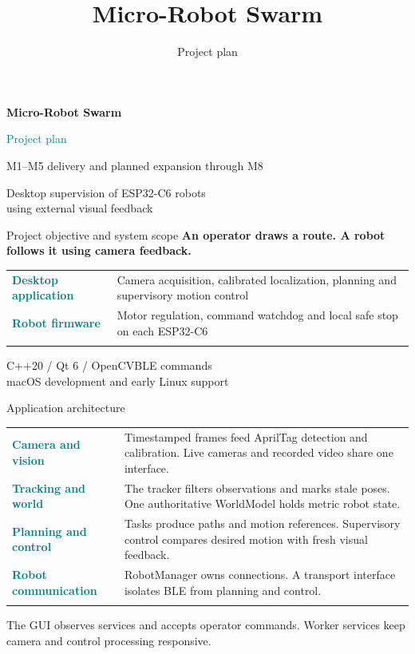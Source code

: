 \documentclass[11pt,aspectratio=169]{beamer}
\title{Micro-Robot Swarm}
\subtitle{Project plan}
\author{}
\date{}
\newcommand{\planrow}[2]{\textcolor{Teal}{\textbf{#1}} & #2 \\\noalign{\vskip 12pt}}
\begin{document}
\begin{frame}[plain]
\vspace{8mm}
{\LARGE\bfseries Micro-Robot Swarm\par}
\vspace{4mm}
{\Large\textcolor{Teal}{Project plan}\par}
\vspace{9mm}
M1--M5 delivery and planned expansion through M8
\vspace{7mm}

\textcolor{Muted}{Desktop supervision of ESP32-C6 robots\\using external visual feedback}
\end{frame}

\begin{frame}{Project objective and system scope}
\textbf{An operator draws a route. A robot follows it using camera feedback.}
\vspace{4mm}

\begin{tabular}{@{}P{3.1cm}P{10.7cm}@{}}
\planrow{Desktop application}{Camera acquisition, calibrated localization, planning and supervisory motion control}
\planrow{Robot firmware}{Motor regulation, command watchdog and local safe stop on each ESP32-C6}
\end{tabular}
\vspace{3mm}

\small\textcolor{Muted}{C++20 / Qt 6 / OpenCV\quad BLE commands\\macOS development and early Linux support}
\end{frame}

\begin{frame}{Application architecture}
\small
\begin{tabular}{@{}P{3.1cm}P{10.7cm}@{}}
\planrow{Camera and vision}{Timestamped frames feed AprilTag detection and calibration. Live cameras and recorded video share one interface.}
\planrow{Tracking and world}{The tracker filters observations and marks stale poses. One authoritative WorldModel holds metric robot state.}
\planrow{Planning and control}{Tasks produce paths and motion references. Supervisory control compares desired motion with fresh visual feedback.}
\planrow{Robot communication}{RobotManager owns connections. A transport interface isolates BLE from planning and control.}
\end{tabular}

\textcolor{Muted}{The GUI observes services and accepts operator commands. Worker services keep camera and control processing responsive.}
\end{frame}
\end{document}
